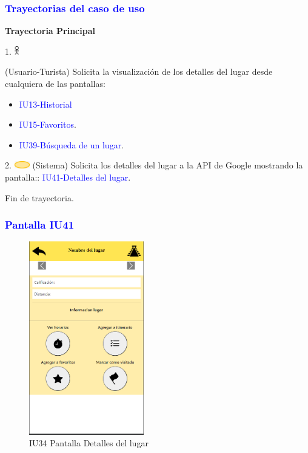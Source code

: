 \pagebreak
\subsubsection{\textcolor{blue}{Trayectorias del caso de uso}}
\textbf{Trayectoria Principal}{

     1. \includegraphics[width=0.0150\textwidth]{Figuras/persona.png}{
        (Usuario-Turista)
        Solicita la visualización de los detalles del lugar desde cualquiera de las pantallas: 
            \begin{itemize}
                \item \textcolor{blue}{IU13-Historial}
                \item \textcolor{blue}{IU15-Favoritos}.
                \item \textcolor{blue}{IU39-Búsqueda de un lugar}.
            \end{itemize}
     }
    
      2. \includegraphics[width=0.0500\textwidth]{Figuras/sistema.png} {
        (Sistema) 
        Solicita los detalles del lugar a la API de Google mostrando la pantalla:: \textcolor{blue}{IU41-Detalles del lugar}.
      }

      Fin de trayectoria.
}

\par
\vspace{1cm}

\subsubsection{\textcolor{blue}{Pantalla IU41}}

    \begin{figure}[htb]
        \centering
        \includegraphics[width= 5cm]{entregable final/pantallasSistema/IU34 Pantalla Detalles del lugar.png}
        \caption{IU34 Pantalla Detalles del lugar}
        \label{fig:enter-label}
    \end{figure}

